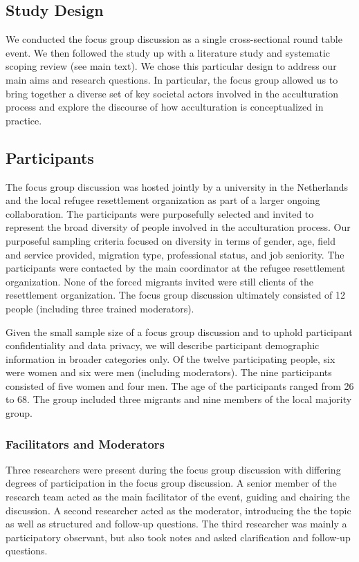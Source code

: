 \documentclass[man, 12pt, a4paper]{apa7}
\begin{document}
\subsection{Study Design}

We conducted the focus group discussion as a single cross-sectional round table event. We then followed the study up with a literature study and systematic scoping review (see main text). We chose this particular design to address our main aims and research questions. In particular, the focus group allowed us to bring together a diverse set of key societal actors involved in the acculturation process and explore the discourse of how acculturation is conceptualized in practice.

\subsection{Participants}

The focus group discussion was hosted jointly by a university in the Netherlands and the local refugee resettlement organization as part of a larger ongoing collaboration. The participants were purposefully selected and invited to represent the broad diversity of people involved in the acculturation process. Our purposeful sampling criteria focused on diversity in terms of gender, age, field and service provided, migration type, professional status, and job seniority. The participants were contacted by the main coordinator at the refugee resettlement organization. None of the forced migrants invited were still clients of the resettlement organization. The focus group discussion ultimately consisted of 12 people (including three trained moderators). 

Given the small sample size of a focus group discussion and to uphold participant confidentiality and data privacy, we will describe participant demographic information in broader categories only. Of the twelve participating people, six were women and six were men (including moderators). The nine participants consisted of five women and four men. The age of the participants ranged from 26 to 68. The group included three migrants and nine members of the local majority group.

\subsubsection{Facilitators and Moderators}

Three researchers were present during the focus group discussion with differing degrees of participation in the focus group discussion. A senior member of the research team acted as the main facilitator of the event, guiding and chairing the discussion. A second researcher acted as the moderator, introducing the the topic as well as structured and follow-up questions. The third researcher was mainly a participatory observant, but also took notes and asked clarification and follow-up questions.
\end{document}
